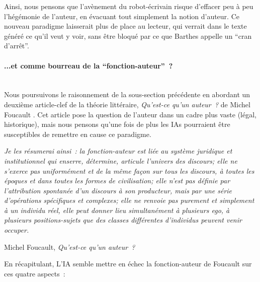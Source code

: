 \documentclass{article}
\newcommand{\subsubsubsection}[1]{\paragraph{#1}\mbox{}\\}
\newenvironment{citationbox}
{\begin{center}
		\begin{minipage}{.8\textwidth}
		}
		{
		\end{minipage}	
\end{center}
}
\begin{document}
					Ainsi, nous pensons que l'avènement du robot-écrivain risque d'effacer peu à peu l'hégémonie de l'auteur, en évacuant tout simplement la notion d'auteur. Ce nouveau paradigme laisserait plus de place au lecteur, qui verrait dans le texte généré ce qu'il veut y voir, sans être bloqué par ce que Barthes appelle un ``cran d'arrêt''.
				\subsubsubsection{...et comme bourreau de la ``fonction-auteur''~?}
					Nous poursuivons le raisonnement de la sous-section précédente en abordant un deuxième article-clef de la théorie littéraire, \textit{Qu'est-ce qu'un auteur~?} de Michel Foucault \cite{foucault1969}. Cet article pose la question de l'auteur dans un cadre plus vaste (légal, historique), mais nous pensons qu'une fois de plus les IAs pourraient être susceptibles de remettre en cause ce paradigme.
					\begin{citationbox}
						\textit{Je les résumerai ainsi~: la fonction-auteur est liée
						au système juridique et institutionnel qui enserre, détermine, articule l'univers des discours; elle ne
						s'exerce pas uniformément et de la même façon sur tous les discours, à toutes les époques et dans
						toutes les formes de civilisation; elle n'est pas définie par l'attribution spontanée d'un discours à
						son producteur, mais par une série d'opérations spécifiques et complexes; elle ne renvoie pas purement et simplement à un individu réel, elle peut donner lieu simultanément à plusieurs ego, à
						plusieurs positions-sujets que des classes différentes d'individus peuvent venir occuper.}
					\begin{flushright}
						Michel Foucault, \textit{Qu'est-ce qu'un auteur~?} \cite{foucault1969}
					\end{flushright}
					\end{citationbox}
					En récapitulant, L'IA semble mettre en échec la fonction-auteur de Foucault sur ces quatre aspects~:
\end{document}
